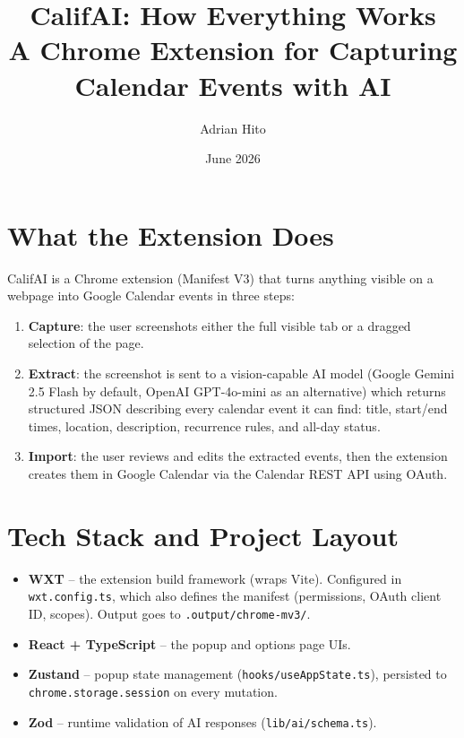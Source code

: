 \documentclass[11pt]{article}
\title{CalifAI: How Everything Works\\
\large A Chrome Extension for Capturing Calendar Events with AI}
\author{Adrian Hito}
\date{June 2026}
\begin{document}
\maketitle
\tableofcontents
\newpage

\section{What the Extension Does}

CalifAI is a Chrome extension (Manifest V3) that turns anything visible on a
webpage into Google Calendar events in three steps:

\begin{enumerate}
  \item \textbf{Capture}: the user screenshots either the full visible tab or a
        dragged selection of the page.
  \item \textbf{Extract}: the screenshot is sent to a vision-capable AI model
        (Google Gemini 2.5 Flash by default, OpenAI GPT-4o-mini as an
        alternative) which returns structured JSON describing every calendar
        event it can find: title, start/end times, location, description,
        recurrence rules, and all-day status.
  \item \textbf{Import}: the user reviews and edits the extracted events, then
        the extension creates them in Google Calendar via the Calendar REST
        API using OAuth.
\end{enumerate}

\section{Tech Stack and Project Layout}

\begin{itemize}
  \item \textbf{WXT} -- the extension build framework (wraps Vite). Configured
        in \texttt{wxt.config.ts}, which also defines the manifest
        (permissions, OAuth client ID, scopes). Output goes to
        \texttt{.output/chrome-mv3/}.
  \item \textbf{React + TypeScript} -- the popup and options page UIs.
  \item \textbf{Zustand} -- popup state management
        (\texttt{hooks/useAppState.ts}), persisted to
        \texttt{chrome.storage.session} on every mutation.
  \item \textbf{Zod} -- runtime validation of AI responses
        (\texttt{lib/ai/schema.ts}).
\end{itemize}
\end{document}
